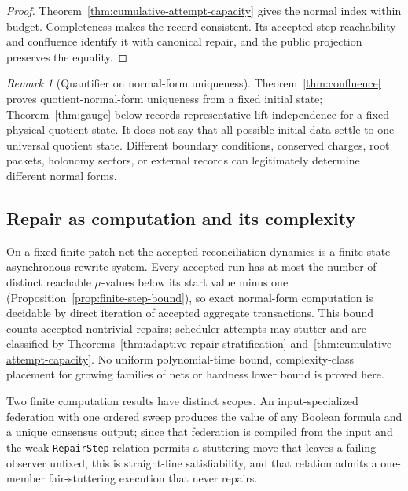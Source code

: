 \documentclass[11pt]{article}
\theoremstyle{remark}
\newtheorem{remark}[theorem]{Remark}
\theoremstyle{plain}
\begin{document}
\begin{proof}
Theorem~\ref{thm:cumulative-attempt-capacity} gives the normal index within
budget.  Completeness makes the record consistent.  Its accepted-step
reachability and confluence identify it with canonical repair, and the public
projection preserves the equality.
\end{proof}

\begin{remark}[Quantifier on normal-form uniqueness]\label{rem:normal-form-quantifier}
Theorem~\ref{thm:confluence} proves quotient-normal-form uniqueness from a
fixed initial state; Theorem~\ref{thm:gauge} below records representative-lift
independence for a fixed physical quotient state. It does not say that all
possible initial data settle to one universal quotient state. Different boundary
conditions, conserved charges, root packets, holonomy sectors, or external records can
legitimately determine different normal forms.
\end{remark}

\subsection{Repair as computation and its complexity}
\label{sec:repair-computation}

On a fixed finite patch net the accepted reconciliation dynamics is a
finite-state asynchronous rewrite system. Every accepted run has at most the
number of distinct reachable \(\mu\)-values below its start value minus one
(Proposition~\ref{prop:finite-step-bound}), so exact normal-form computation
is decidable by direct iteration of accepted aggregate transactions. This
bound counts accepted nontrivial repairs; scheduler attempts may stutter and
are classified by Theorems~\ref{thm:adaptive-repair-stratification}
and~\ref{thm:cumulative-attempt-capacity}. No uniform polynomial-time bound,
complexity-class placement for growing families of nets or hardness lower
bound is proved here.

Two finite computation results have distinct scopes. An input-specialized
federation with one ordered sweep produces the value of any Boolean formula
and a unique consensus output; since that federation is compiled from the
input and the weak \texttt{RepairStep} relation permits a stuttering move
that leaves a failing observer unfixed, this is straight-line
satisfiability, and that relation admits a one-member fair-stuttering
execution that never repairs.
\end{document}
